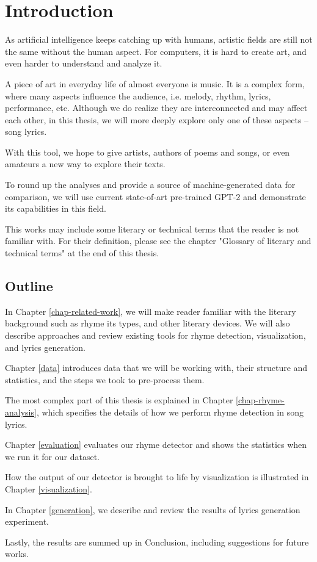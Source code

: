 \chapter*{Introduction}

As artificial intelligence keeps catching up with humans, artistic fields are still not the same without the human aspect. For computers, it is hard to create art, and even harder to understand and analyze it. 

A piece of art in everyday life of almost everyone is music. It is a complex form, where many aspects influence the audience, i.e. melody, rhythm, lyrics, performance, etc. Although we do realize they are interconnected and may affect each other, in this thesis, we will more deeply explore only one of these aspects -- song lyrics. 



With this tool, we hope to give artists, authors of poems and songs, or even amateurs a new way to explore their texts.




To round up the analyses and provide a source of machine-generated data for comparison, we will use current state-of-art pre-trained GPT-2 and demonstrate its capabilities in this field.

This works may include some literary or technical terms that the reader is not familiar with. For their definition, please see the chapter "Glossary of literary and technical terms" at the end of this thesis.


\section*{Outline}
In Chapter \ref{chap-related-work}, we will make reader familiar with the literary background such as rhyme its types, and other literary devices. We will also describe approaches and review existing tools for rhyme detection, visualization, and lyrics generation. 

Chapter \ref{data} introduces data that we will be working with, their structure and statistics, and the steps we took to pre-process them.

The most complex part of this thesis is explained in Chapter \ref{chap-rhyme-analysis}, which specifies the details of how we perform rhyme detection in song lyrics.

Chapter \ref{evaluation} evaluates our rhyme detector and shows the statistics when we run it for our dataset.

How the output of our detector is brought to life by visualization is illustrated in Chapter \ref{visualization}.

In Chapter \ref{generation}, we describe and review the results of lyrics generation experiment.

Lastly, the results are summed up in Conclusion, including suggestions for future works.